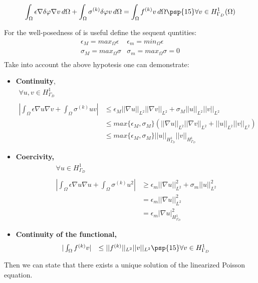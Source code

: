 \begin{equation}
\label{eq: NLP weakformulation}
\int_{\Omega} \epsilon \nabla \delta\varphi \nabla v \, d\Omega + \int_{\Omega} \sigma^{(k)}\delta \varphi v \, d\Omega = \int_{\Omega} f^{(k)}v \, d\Omega \psp{15} \forall v \in H^1_{\Gamma_D}(\Omega)
\end{equation}

For the well-posedness of  is useful define the sequent quntities:
\begin{equation*}
\begin{array}{ll}
\epsilon_M = max_{\Omega} \epsilon & \epsilon_m = min_{\Omega} \epsilon \\
\sigma_M = max_{\Omega} \sigma & \sigma_m = max_{\Omega} \sigma = 0 \\
\end{array}
\end{equation*}
Take into account the above hypotesis one can demonstrate:
\begin{itemize}
\item \textbf{Continuity},
\begin{equation*}
\begin{array}{ll}
\forall u,v \in H^1_{\Gamma_D} &\\ \\
|\int_{\Omega} \epsilon \nabla u \nabla v + \int_{\Omega} \sigma^{(k)}u v| 
& \leq \epsilon_{M} ||\nabla u ||_{L^2} || \nabla v ||_{L^2} +  \sigma_{M} ||u ||_{L^2} ||v ||_{L^2} 
\\
& \leq max\{\epsilon_{M}, \sigma_{M} \}  
\left( ||\nabla u ||_{L^2} || \nabla v ||_{L^2} +   ||u ||_{L^2} ||v ||_{L^2} \right)
\\
& \leq max\{\epsilon_{M}, \sigma_{M} \}  
||u ||_{H^1_{\Gamma_D}} || v ||_{H^1_{\Gamma_D}}
\end{array}
\end{equation*}

\item \textbf{Coercivity,}
\begin{equation*}
\begin{array}{ll}
\forall u \in H^1_{\Gamma_D} &\\ \\
|\int_{\Omega} \epsilon \nabla u \nabla u + \int_{\Omega} \sigma^{(k)}u^2| 
& \geq \epsilon_{m} ||\nabla u ||_{L^2}^2  +  \sigma_{m} ||u ||_{L^2}^2 
\\
& =  \epsilon_{m} ||\nabla u ||_{L^2}^2 
\\
& = \epsilon_{m} |\nabla u |_{H^1_{\Gamma_D}}^2 
\end{array}
\end{equation*}

\item \textbf{Continuity of the functional,}
\begin{equation*}
\begin{array}{ll}
|\int_{\Omega} f^{(k)} v |
& \leq ||f^{(k)} ||_{L^2}||v ||_{L^2} \psp{15} \forall v \in H^1_{\Gamma_D}
\end{array}
\end{equation*}
\end{itemize}

Then we can state that there exists a unique solution of the linearized Poisson equation.